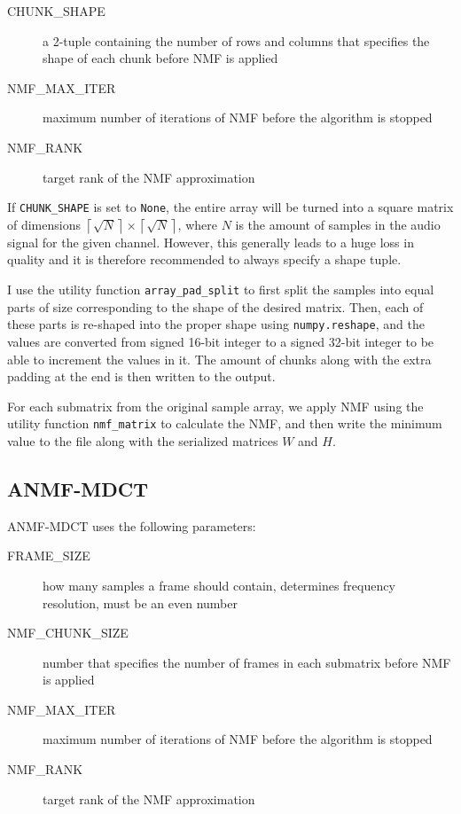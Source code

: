 \begin{description}
	\item[CHUNK\_SHAPE] a 2-tuple containing the number of rows and columns that specifies the shape of each chunk before NMF is applied
	\item[NMF\_MAX\_ITER] maximum number of iterations of NMF before the algorithm is stopped
	\item[NMF\_RANK] target rank of the NMF approximation
\end{description}

If \verb|CHUNK_SHAPE| is set to \verb|None|, the entire array will be turned into a square matrix of dimensions $\left\lceil\sqrt{N}\right\rceil \times \left\lceil\sqrt{N}\right\rceil$, where $N$ is the amount of samples in the audio signal for the given channel. However, this generally leads to a huge loss in quality and it is therefore recommended to always specify a shape tuple.

I use the utility function \verb|array_pad_split| to first split the samples into equal parts of size corresponding to the shape of the desired matrix. Then, each of these parts is re-shaped into the proper shape using \verb|numpy.reshape|, and the values are converted from signed 16-bit integer to a signed 32-bit integer to be able to increment the values in it. The amount of chunks along with the extra padding at the end is then written to the output.

For each submatrix from the original sample array, we apply NMF using the utility function \verb|nmf_matrix| to calculate the NMF, and then write the minimum value to the file along with the serialized matrices $W$ and $H$.

\subsection{ANMF-MDCT}
ANMF-MDCT uses the following parameters:

\begin{description}
	\item[FRAME\_SIZE] how many samples a frame should contain, determines frequency resolution, must be an even number
	\item[NMF\_CHUNK\_SIZE] number that specifies the number of frames in each submatrix before NMF is applied
	\item[NMF\_MAX\_ITER] maximum number of iterations of NMF before the algorithm is stopped
	\item[NMF\_RANK] target rank of the NMF approximation
\end{description}

